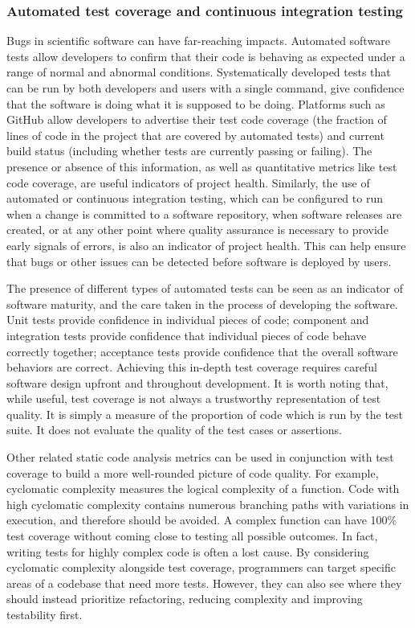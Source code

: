 \subsubsection{Automated test coverage and continuous integration testing}
Bugs in scientific software can have far-reaching impacts. Automated software tests allow developers to confirm that their code is behaving as expected under a range of normal and abnormal conditions. Systematically developed tests that can be run by both developers and users with a single command, give confidence that the software is doing what it is supposed to be doing. Platforms such as GitHub allow developers to advertise their test code coverage (the fraction of lines of code in the project that are covered by automated tests) and current build status (including whether tests are currently passing or failing). The presence or absence of this information, as well as quantitative metrics like test code coverage, are useful indicators of project health. Similarly, the use of automated or continuous integration testing, which can be configured to run when a change is committed to a software repository, when software releases are created, or at any other point where quality assurance is necessary to provide early signals of errors, is also an indicator of project health. This can help ensure that bugs or other issues can be detected before software is deployed by users.

The presence of different types of automated tests can be seen as an indicator of software maturity, and the care taken in the process of developing the software. Unit tests provide confidence in individual pieces of code; component and integration tests provide confidence that individual pieces of code behave correctly together; acceptance tests provide confidence that the overall software behaviors are correct. Achieving this in-depth test coverage requires careful software design upfront and throughout development. It is worth noting that, while useful, test coverage is not always a trustworthy representation of test quality. It is simply a measure of the proportion of code which is run by the test suite. It does not evaluate the quality of the test cases or assertions.

Other related static code analysis metrics can be used in conjunction with test coverage to build a more well-rounded picture of code quality. For example, cyclomatic complexity measures the logical complexity of a function. Code with high cyclomatic complexity contains numerous branching paths with variations in execution, and therefore should be avoided. A complex function can have 100\% test coverage without coming close to testing all possible outcomes. In fact, writing tests for highly complex code is often a lost cause. By considering cyclomatic complexity alongside test coverage, programmers can target specific areas of a codebase that need more tests. However, they can also see where they should instead prioritize refactoring, reducing complexity and improving testability first.

